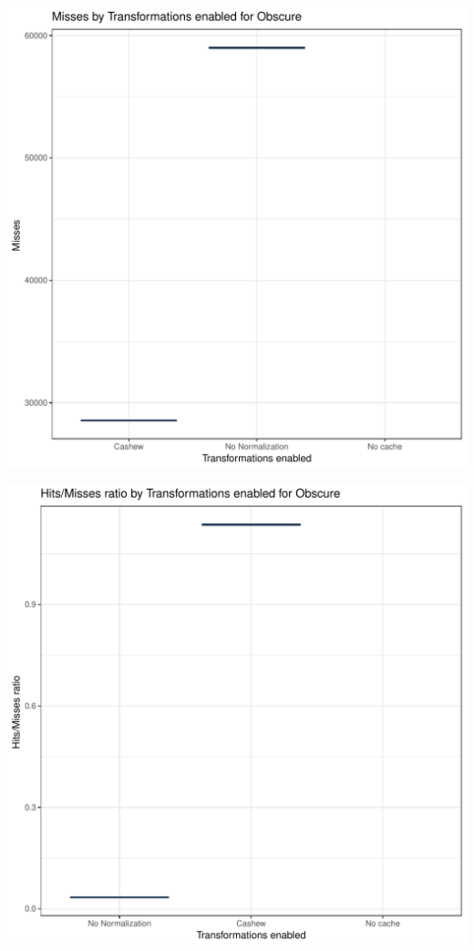 \documentclass{article}\usepackage[]{graphicx}\usepackage[]{color}
\makeatletter
\def\maxwidth{ %
  \ifdim\Gin@nat@width>\linewidth
    \linewidth
  \else
    \Gin@nat@width
  \fi
}
\newenvironment{knitrout}{}{} %
\makeatother
\begin{document}
\begin{knitrout}
\includegraphics[width=\maxwidth]{figure/obscure-3} 

\includegraphics[width=\maxwidth]{figure/obscure-4} 

\end{knitrout}
\end{document}
